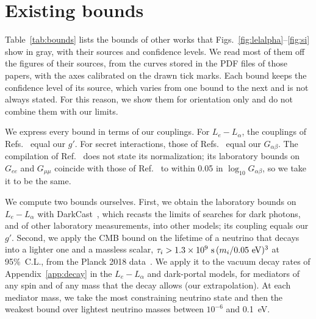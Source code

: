 \documentclass[linenumbers, aps, prd, twocolumn, superscriptaddress, floatfix, longbibliography, nofootinbib, bibnotes]{revtex4-2}
\begin{document}
\section{Existing bounds}
\label{app:bounds}
Table~\ref{tab:bounds} lists the bounds of other works that Figs.~\ref{fig:lelalpha}--\ref{fig:si} show in gray, with their sources and confidence levels.
We read most of them off the figures of their sources, from the curves stored in the PDF files of those papers, with the axes calibrated on the drawn tick marks.
Each bound keeps the confidence level of its source, which varies from one bound to the next and is not always stated.
For this reason, we show them for orientation only and do not combine them with our limits.

We express every bound in terms of our couplings.
For $L_e - L_\alpha$, the couplings of Refs.~\cite{Coloma:2020gfv, Dror:2020fbh, Bauer:2018onh} equal our $g'$.
For secret interactions, those of Refs.~\cite{Blinov:2019gcj, Brdar:2020nbj} equal our $G_{\alpha\beta}$.
The compilation of Ref.~\cite{Berryman:2022hds} does not state its normalization; its laboratory bounds on $G_{ee}$ and $G_{\mu\mu}$ coincide with those of Ref.~\cite{Blinov:2019gcj} to within 0.05 in $\log_{10} G_{\alpha\beta}$, so we take it to be the same.

We compute two bounds ourselves.
First, we obtain the laboratory bounds on $L_e - L_\alpha$ with DarkCast~\cite{Ilten:2018crw, Baruch:2022esd}, which recasts the limits of searches for dark photons, and of other laboratory measurements, into other models; its coupling equals our $g'$.
Second, we apply the CMB bound on the lifetime of a neutrino that decays into a lighter one and a massless scalar, $\tau_i > 1.3 \times 10^9~{\rm s}\, (m_i / 0.05~{\rm eV})^3$ at 95\%~C.L., from the Planck 2018 data~\cite{Escudero:2019gfk}.
We apply it to the vacuum decay rates of Appendix~\ref{app:decay} in the $L_e - L_\alpha$ and dark-portal models, for mediators of any spin and of any mass that the decay allows (our extrapolation).
At each mediator mass, we take the most constraining neutrino state and then the weakest bound over lightest neutrino masses between $10^{-6}$ and 0.1~eV.
\end{document}

